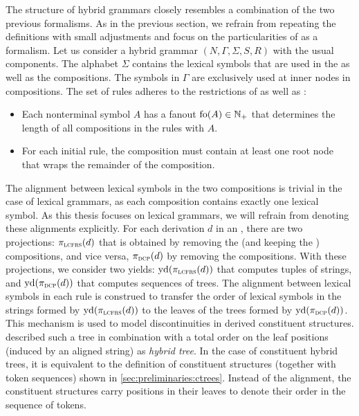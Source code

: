 \documentclass[../../document.tex]{subfiles}
\begin{document}
    The structure of hybrid grammars closely resembles a combination of the two previous formalisms.
    As in the previous section, we refrain from repeating the definitions with small adjustments and focus on the particularities of  as a formalism.
    Let us consider a hybrid grammar \((N, \varGamma, \varSigma, S, R)\) with the usual components.
    The alphabet \(\varSigma\) contains the lexical symbols that are used in the  as well as the  compositions.
    The symbols in \(\varGamma\) are exclusively used at inner nodes in  compositions.
    The set of rules adheres to the restrictions of  as well as :
    \begin{itemize}
        \item Each nonterminal symbol \(A\) has a fanout \(\operatorname{fo}(A) \in \mathbb{N}_+\) that determines the length of all  compositions in the rules with  \(A\).
        \item For each initial rule, the  composition must contain at least one root node that wraps the remainder of the composition.
    \end{itemize}
    The alignment between lexical symbols in the two compositions is trivial in the case of lexical grammars, as each composition contains exactly one lexical symbol.
    As this thesis focuses on lexical grammars, we will refrain from denoting these alignments explicitly.
    For each derivation \(d\) in an , there are two projections: \(\pi_{\textsc{lcfrs}}(d)\) that is obtained by removing the  (and keeping the ) compositions, and vice versa, \(\pi_{\textsc{dcp}}(d)\) by removing the  compositions.
    With these projections, we consider two yields: \(\operatorname{yd}(\pi_{\textsc{lcfrs}}(d))\) that computes tuples of strings, and \(\operatorname{yd}(\pi_{\textsc{dcp}}(d))\) that computes sequences of trees.
    The alignment between lexical symbols in each rule is construed to transfer the order of lexical symbols in the strings formed by \(\operatorname{yd}(\pi_{\textsc{lcfrs}}(d))\) to the leaves of the trees formed by \(\operatorname{yd}(\pi_{\textsc{dcp}}(d))\).
    This mechanism is used to model discontinuities in derived constituent structures.
     described such a tree in combination with a total order on the leaf positions (induced by an aligned string) as \emph{hybrid tree}.
    In the case of constituent hybrid trees, it is equivalent to the definition of constituent structures (together with token sequences) shown in \cref{sec:preliminaries:ctrees}.
    Instead of the alignment, the constituent structures carry positions in their leaves to denote their order in the sequence of tokens.
\end{document}
